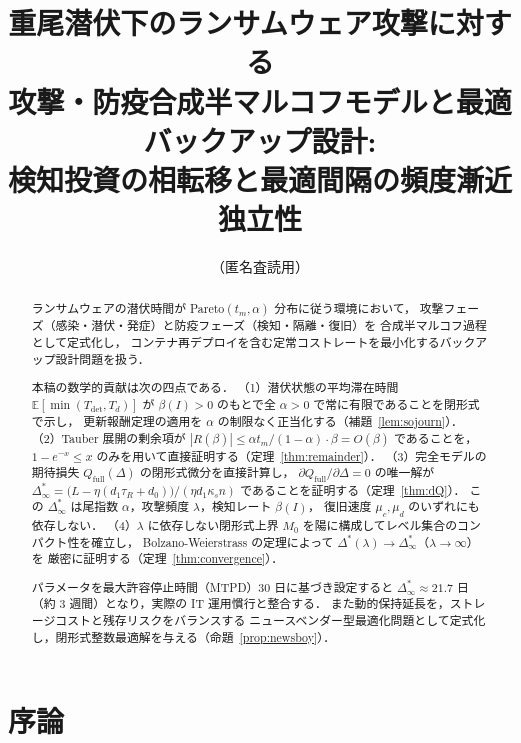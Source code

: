 \documentclass[12pt,a4paper]{article}
\theoremstyle{plain}
\theoremstyle{definition}
\theoremstyle{remark}
\newcommand{\E}{\mathbb{E}}
\newcommand{\Qf}{Q_{\mathrm{full}}}
\newcommand{\Tdet}{T_{\mathrm{det}}}
\newcommand{\betaI}{\beta(I)}
\newcommand{\Dopt}{\Delta^{*}}
\newcommand{\Dinf}{\Delta^{*}_{\infty}}
\begin{document}
\title{重尾潜伏下のランサムウェア攻撃に対する\\
攻撃・防疫合成半マルコフモデルと最適バックアップ設計:\\
検知投資の相転移と最適間隔の頻度漸近独立性}
\author{（匿名査読用）}
\date{}
\maketitle

\begin{abstract}
ランサムウェアの潜伏時間が Pareto$(t_m,\alpha)$ 分布に従う環境において，
攻撃フェーズ（感染・潜伏・発症）と防疫フェーズ（検知・隔離・復旧）を
合成半マルコフ過程として定式化し，
コンテナ再デプロイを含む定常コストレートを最小化するバックアップ設計問題を扱う．

本稿の数学的貢献は次の四点である．
（1）潜伏状態の平均滞在時間 $\E[\min(\Tdet,T_d)]$ が
$\betaI>0$ のもとで全 $\alpha>0$ で常に有限であることを閉形式で示し，
更新報酬定理の適用を $\alpha$ の制限なく正当化する（補題~\ref{lem:sojourn}）．
（2）Tauber 展開の剰余項が $|R(\beta)|\le\alpha t_m/(1-\alpha)\cdot\beta=O(\beta)$
であることを，$1-e^{-x}\le x$ のみを用いて直接証明する（定理~\ref{thm:remainder}）．
（3）完全モデルの期待損失 $\Qf(\Delta)$ の閉形式微分を直接計算し，
$\partial\Qf/\partial\Delta=0$ の唯一解が
$\Dinf=\bigl(L-\eta(d_1\tau_R+d_0)\bigr)/(\eta d_1\kappa_s n)$
であることを証明する（定理~\ref{thm:dQ}）．
この $\Dinf$ は尾指数 $\alpha$，攻撃頻度 $\lambda$，検知レート $\betaI$，
復旧速度 $\mu_c,\mu_d$ のいずれにも依存しない．
（4）$\lambda$ に依存しない閉形式上界 $M_0$ を陽に構成してレベル集合のコンパクト性を確立し，
Bolzano-Weierstrass の定理によって $\Dopt(\lambda)\to\Dinf$（$\lambda\to\infty$）を
厳密に証明する（定理~\ref{thm:convergence}）．

パラメータを最大許容停止時間（MTPD）30 日に基づき設定すると
$\Dinf\approx21.7$ 日（約 3 週間）となり，実際の IT 運用慣行と整合する．
また動的保持延長を，ストレージコストと残存リスクをバランスする
ニュースベンダー型最適化問題として定式化し，閉形式整数最適解を与える（命題~\ref{prop:newsboy}）．
\end{abstract}

\tableofcontents
\newpage

\section{序論}
\label{sec:intro}
\end{document}
